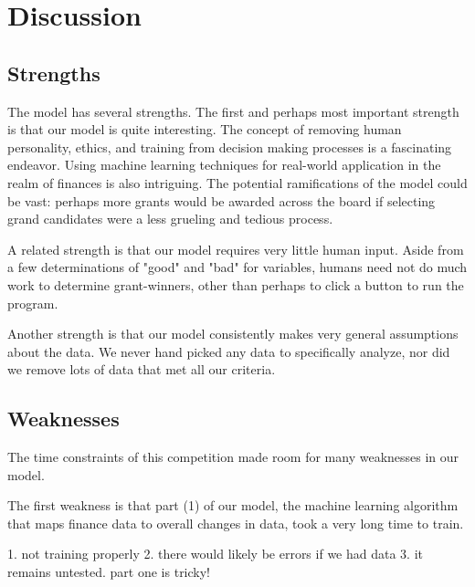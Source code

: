 \documentclass[paper.tex]{subfiles}
\begin{document}
	\section{Discussion}
	\subsection{Strengths}
	The model has several strengths. The first and perhaps most important strength is that our model is quite interesting. The concept of removing human personality, ethics, and training from decision making processes is a fascinating endeavor. Using machine learning techniques for real-world application in the realm of finances is also intriguing. The potential ramifications of the model could be vast: perhaps more grants would be awarded across the board if selecting grand candidates were a less grueling and tedious process. 
	
	A related strength is that our model requires very little human input. Aside from a few determinations of "good" and "bad" for variables, humans need not do much work to determine grant-winners, other than perhaps to click a button to run the program.
	
	Another strength is that our model consistently makes very general assumptions about the data. We never hand picked any data to specifically analyze, nor did we remove lots of data that met all our criteria. 
		
	\subsection{Weaknesses}
	The time constraints of this competition made room for many weaknesses in our model.
	
	The first weakness is that part (1) of our model, the machine learning algorithm that maps finance data to overall changes in data, took a very long time to train.
	
	1. not training properly
	2. there would likely be errors if we had data
	3. it remains untested. part one is tricky!
\end{document}

